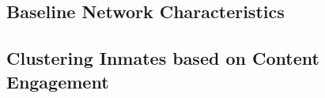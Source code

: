\documentclass[
]{article}
\begin{document}
\hypertarget{baseline-network-characteristics}{%
\subsection{Baseline Network
Characteristics}\label{baseline-network-characteristics}}

\hypertarget{clustering-inmates-based-on-content-engagement}{%
\subsection{Clustering Inmates based on Content
Engagement}\label{clustering-inmates-based-on-content-engagement}}
\end{document}
